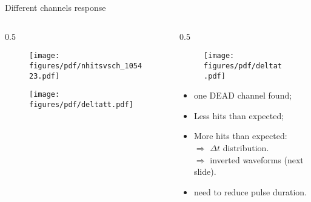 \documentclass{beamer}[10pt]
\begin{document}
\begin{frame}{Different channels response}
\vspace{-4mm}
\begin{columns}
\begin{column}{0.5\framewidth}
\begin{figure}[H]
   \centering
   \texttt{[image: figures/pdf/nhitsvsch\_105423.pdf]}
   \label{fig:wfgkgnvjkhl}
 \end{figure}
\begin{figure}[H]
   \centering
   \texttt{[image: figures/pdf/deltatt.pdf]}
   \label{fig:wfgkgnvjkhl}
 \end{figure}
\end{column}
\begin{column}{0.5\framewidth}
\begin{figure}[H]
   \centering
   \texttt{[image: figures/pdf/deltat.pdf]}
   \label{fig:wfgkgnvjkhl}
 \end{figure}

\begin{itemize}
\item one DEAD channel found;
\item Less hits than expected;
\item More hits than expected:
\\
$\Rightarrow$ $\Delta t$ distribution.
\\
$\Rightarrow$ inverted waveforms (next slide).
\item need to reduce pulse duration.
\end{itemize}
\end{column}
\end{columns}



\end{frame}
\end{document}
